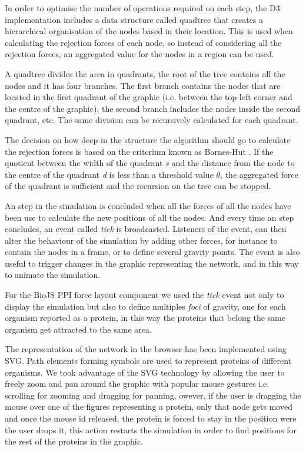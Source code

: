 In order to optimise the number of operations required on each step, the D3 implementation includes a data structure called quadtree that creates a hierarchical organisation of the nodes based in their location. This is used when calculating the rejection forces of each node, so instead of considering all the rejection forces, an aggregated value for the nodes in a region can be used.

A quadtree divides the area in quadrants, the root of the tree contains all the nodes and it has four branches. The first branch contains the nodes that are located in the first quadrant of the graphic (i.e. between the top-left corner and the centre of the graphic), the second branch includes the nodes inside the second quadrant, etc. The same division can be recursively calculated for each quadrant.

The decision on how deep in the structure the algorithm should go to calculate the rejection forces is based on the criterium known as Barnes-Hut \cite{BAR1986}. If the quotient between the width of the quadrant \emph{s} and the distance from the node to the centre of the quadrant \emph{d} is less than a threshold value $\theta$, the aggregated force of the quadrant is sufficient and the recursion on the tree can be stopped. 


An step in the simulation is concluded when all the forces of all the nodes have been use to calculate the new positions of all the nodes. And every time an step concludes, an event called \emph{tick} is broadcasted. Listeners of the event, can then alter the behaviour of the simulation by adding other forces, for instance to contain the nodes in a frame, or to define several gravity points. The event is also useful to trigger changes in the graphic representing the network, and in this way to animate the simulation.

For the BioJS PPI force layout component we used the \emph{tick} event not only to display the simulation but also to  define multiples \emph{foci} of gravity, one for each organism reported as a protein, in this way the proteins that belong the same organism get attracted to the same area.

The representation of the network in the browser has been implemented using SVG. Path elements forming symbols are used to represent proteins of different organisms. We took advantage of the SVG technology by allowing the user to freely zoom and pan around the graphic with popular mouse gestures i.e. scrolling for zooming and dragging for panning, owever, if the user is dragging the mouse over one of the figures representing a protein, only that node gets moved and once the mouse id released, the protein is forced to stay in the position were the user drops it, this action restarts the simulation in  order to find positions for the rest of the proteins in the graphic.


